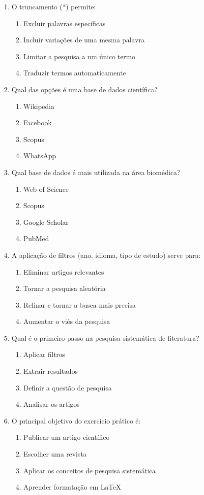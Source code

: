 \documentclass[12pt,a4paper]{article}
\begin{document}
\begin{enumerate}[label=\textbf{\arabic*.}]
\item O truncamento (*) permite:
\begin{enumerate}[label=\alph*)]
    \item Excluir palavras específicas
    \item Incluir variações de uma mesma palavra
    \item Limitar a pesquisa a um único termo
    \item Traduzir termos automaticamente
\end{enumerate}

\item Qual das opções é uma base de dados científica?
\begin{enumerate}[label=\alph*)]
    \item Wikipedia
    \item Facebook
    \item Scopus
    \item WhatsApp
\end{enumerate}

\item Qual base de dados é mais utilizada na área biomédica?
\begin{enumerate}[label=\alph*)]
    \item Web of Science
    \item Scopus
    \item Google Scholar
    \item PubMed
\end{enumerate}

\item A aplicação de filtros (ano, idioma, tipo de estudo) serve para:
\begin{enumerate}[label=\alph*)]
    \item Eliminar artigos relevantes
    \item Tornar a pesquisa aleatória
    \item Refinar e tornar a busca mais precisa
    \item Aumentar o viés da pesquisa
\end{enumerate}

\item Qual é o primeiro passo na pesquisa sistemática de literatura?
\begin{enumerate}[label=\alph*)]
    \item Aplicar filtros
    \item Extrair resultados
    \item Definir a questão de pesquisa
    \item Analisar os artigos
\end{enumerate}

\item O principal objetivo do exercício prático é:
\begin{enumerate}[label=\alph*)]
    \item Publicar um artigo científico
    \item Escolher uma revista
    \item Aplicar os conceitos de pesquisa sistemática
    \item Aprender formatação em \LaTeX
\end{enumerate}

\end{enumerate}
\end{document}
